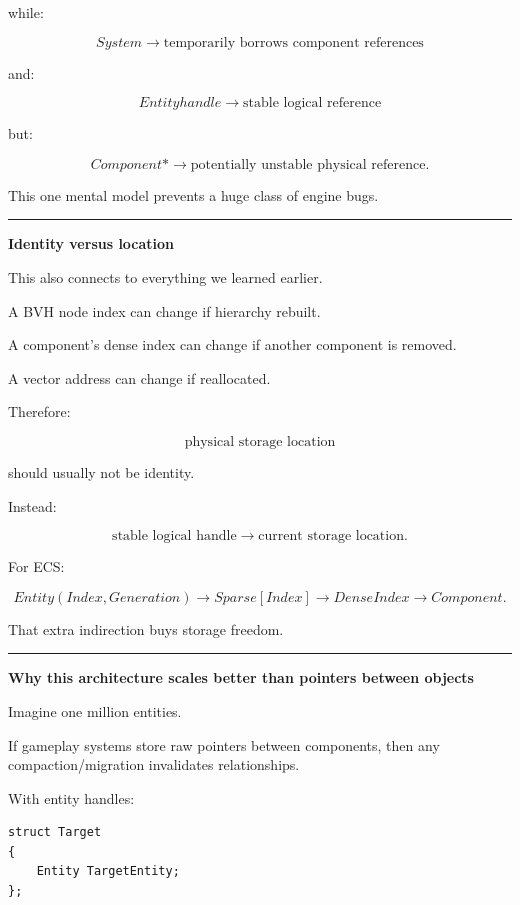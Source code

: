 while:

\[
\boxed{
System
\rightarrow
\text{temporarily borrows component references}
}
\]

and:

\[
\boxed{
Entity handle
\rightarrow
\text{stable logical reference}
}
\]

but:

\[
\boxed{
Component*
\rightarrow
\text{potentially unstable physical reference}.
}
\]

This one mental model prevents a huge class of engine bugs.

\begin{center}\rule{0.5\linewidth}{0.5pt}\end{center}

\textbf{Identity versus location}

This also connects to everything we learned earlier.

A BVH node index can change if hierarchy rebuilt.

A component's dense index can change if another component is removed.

A vector address can change if reallocated.

Therefore:

\[
\text{physical storage location}
\]

should usually not be identity.

Instead:

\[
\text{stable logical handle}
\rightarrow
\text{current storage location}.
\]

For ECS:

\[
Entity(Index,Generation)
\rightarrow
Sparse[Index]
\rightarrow
DenseIndex
\rightarrow
Component.
\]

That extra indirection buys storage freedom.

\begin{center}\rule{0.5\linewidth}{0.5pt}\end{center}

\textbf{Why this architecture scales better than pointers between objects}

Imagine one million entities.

If gameplay systems store raw pointers between components, then any compaction/migration invalidates relationships.

With entity handles:

\begin{verbatim}
struct Target
{
    Entity TargetEntity;
};
\end{verbatim}

